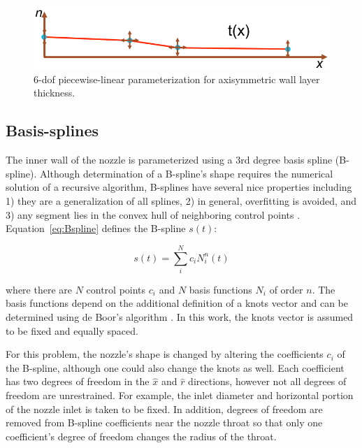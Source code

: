 \documentclass{article}
\begin{document}
\begin{figure}
\caption{6-dof piecewise-linear parameterization for axisymmetric wall layer thickness.}
\label{fig:wall_param_layer}
\begin{center}
\includegraphics[scale=0.4]{figs/piecewiselinear_parameterization.png}
\end{center}
\end{figure}

\subsection{Basis-splines}

The inner wall of the nozzle is parameterized using a 3rd degree basis spline (B-spline). Although determination of a B-spline's shape requires the numerical solution of a recursive algorithm, B-splines have several nice properties including 1) they are a generalization of all splines, 2) in general, overfitting is avoided, and 3) any segment lies in the convex hull of neighboring control points \cite{prautzsch_bezier_2002}. Equation~\ref{eq:Bspline} defines the B-spline $s(t)$:

\begin{equation}
\label{eq:Bspline}
s(t) = \sum_i^N c_i N_i^n(t)
\end{equation}

where there are $N$ control points $c_i$ and $N$ basis functions $N_i$ of order $n$. The basis functions depend on the additional definition of a knots vector and can be determined using de Boor's algorithm \cite{prautzsch_bezier_2002}. In this work, the knots vector is assumed to be fixed and equally spaced.

For this problem, the nozzle's shape is changed by altering the coefficients $c_i$ of the B-spline, although one could also change the knots as well. Each coefficient has two degrees of freedom in the $\hat{x}$ and $\hat{r}$ directions, however not all degrees of freedom are unrestrained. For example, the inlet diameter and horizontal portion of the nozzle inlet is taken to be fixed. In addition, degrees of freedom are removed from B-spline coefficients near the nozzle throat so that only one coefficient's degree of freedom changes the radius of the throat.
\end{document}
